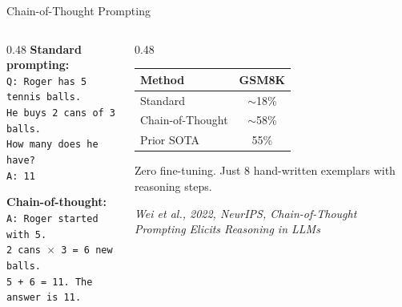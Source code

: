\documentclass[aspectratio=169, 12pt, xcolor=dvipsnames]{beamer}
\newcommand{\papercite}[4]{\emph{#1, #2, #3, #4}}
\begin{document}
\begin{frame}{Chain-of-Thought Prompting}

\begin{columns}[T]
  \begin{column}{0.48\textwidth}
    \textbf{Standard prompting:}\\[0.3em]
    {\small\texttt{Q: Roger has 5 tennis balls.\\
    He buys 2 cans of 3 balls.\\
    How many does he have?}\\[0.3em]
    \texttt{A: 11}}

    \vspace{0.8em}
    \textbf{Chain-of-thought:}\\[0.3em]
    {\small\texttt{A: Roger started with 5.\\
    2 cans $\times$ 3 = 6 new balls.\\
    5 + 6 = \alert{11}. The answer is 11.}}
  \end{column}
  \begin{column}{0.48\textwidth}
    \begin{tabular}{lc}
      \toprule
      \textbf{Method} & \textbf{GSM8K} \\
      \midrule
      Standard & ${\sim}$18\% \\
      Chain-of-Thought & ${\sim}$\alert{58\%} \\
      Prior SOTA & 55\% \\
      \bottomrule
    \end{tabular}

    \vspace{0.8em}
    {\small Zero fine-tuning. Just 8 hand-written
    exemplars with reasoning steps.}

    \vspace{0.5em}
    {\scriptsize \papercite{Wei et al.}{2022}{NeurIPS}{Chain-of-Thought Prompting Elicits Reasoning in LLMs}}
  \end{column}
\end{columns}

\end{frame}
\end{document}
